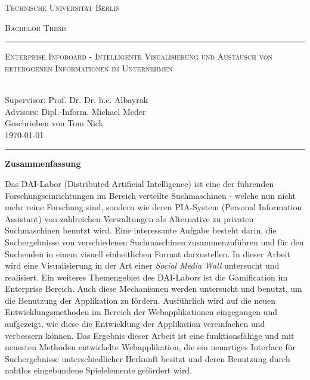 \documentclass[12pt,twoside]{book}
\renewcommand{\title}{Enterprise Infoboard - Intelligente Visualisierung und Austausch von heterogenen Informationen im Unternehmen}
\renewcommand{\author}{Tom Nick}
\begin{document}
\begin{titlepage}
\begin{center}
{\Huge \textsc{Technische Universität Berlin}}
{\fontsize{2.5cm}{2cm}\selectfont \textsc{Bachelor Thesis}\par}
\vspace{1cm}
\hrule
\vspace{0.3cm}
{\Huge \textsc{\title{}}\par}
~\\[0.1cm]
{\Large Supervisor: Prof. Dr. Dr. h.c. Albayrak}\\[0.1cm]
{\Large Advisors: Dipl.-Inform. Michael Meder}\\[0.3cm]
{\Large Geschrieben von \author{}}\\[0.1cm]
{\Large \today}
\vspace{0.55cm}
\hrule
\end{center}
\vfill
\begin{center}{\Large\textbf{Zusammenfassung}}\end{center}

Das DAI-Labor (Distributed Artificial Intelligence) ist eine der führenden Forschungseinrichtungen im Bereich verteilte Suchmaschinen - welche nun nicht mehr reine Forschung sind, sondern wie deren PIA-System (Personal Information Assistant) von zahlreichen Verwaltungen als Alternative zu privaten Suchmaschinen benutzt wird. Eine interessante Aufgabe besteht darin, die Suchergebnisse von verschiedenen Suchmaschinen zusammenzuführen und für den Suchenden in einem visuell einheitlichen Format darzustellen. In dieser Arbeit wird eine Visualisierung in der Art einer \textit{Social Media Wall} untersucht und realisiert.
Ein weiteres Themengebiet des DAI-Labors ist die Gamification im Enterprise Bereich. Auch diese Mechanismen werden untersucht und benutzt, um die Benutzung der Applikation zu fördern.
Ausführlich wird auf die neuen Entwicklungsmethoden im Bereich der Webapplikationen eingegangen und aufgezeigt, wie diese die Entwicklung der Applikation vereinfachen und verbessern können.
Das Ergebnis dieser Arbeit ist eine funktionsfähige und mit neuesten Methoden entwickelte Webapplikation, die ein neuartiges Interface für Suchergebnisse unterschiedlicher Herkunft besitzt und deren Benutzung durch nahtlos eingebundene Spielelemente gefördert wird.

\end{titlepage}
\end{document}
